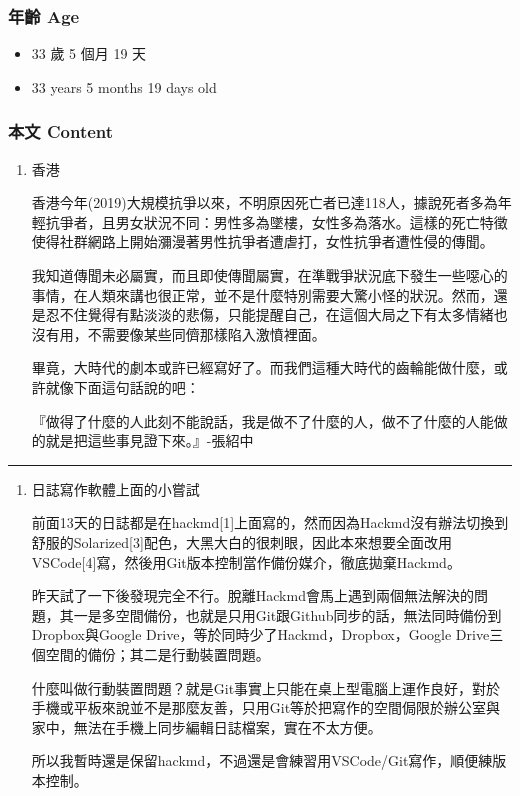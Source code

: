 \documentclass[
]{article}
\providecommand{\tightlist}{%
  \setlength{\itemsep}{0pt}\setlength{\parskip}{0pt}}
\begin{document}
\hypertarget{ux5e74ux9f61-age-11}{%
\subsubsection{年齡 Age}\label{ux5e74ux9f61-age-11}}

\begin{itemize}
\tightlist
\item
  33 歲 5 個月 19 天
\item
  33 years 5 months 19 days old
\end{itemize}

\hypertarget{ux672cux6587-content-11}{%
\subsubsection{本文 Content}\label{ux672cux6587-content-11}}

\begin{enumerate}
\def\labelenumi{\arabic{enumi}.}
\item
  香港

  香港今年(2019)大規模抗爭以來，不明原因死亡者已達118人，據說死者多為年輕抗爭者，且男女狀況不同：男性多為墜樓，女性多為落水。這樣的死亡特徵使得社群網路上開始瀰漫著男性抗爭者遭虐打，女性抗爭者遭性侵的傳聞。

  我知道傳聞未必屬實，而且即使傳聞屬實，在準戰爭狀況底下發生一些噁心的事情，在人類來講也很正常，並不是什麼特別需要大驚小怪的狀況。然而，還是忍不住覺得有點淡淡的悲傷，只能提醒自己，在這個大局之下有太多情緒也沒有用，不需要像某些同儕那樣陷入激憤裡面。

  畢竟，大時代的劇本或許已經寫好了。而我們這種大時代的齒輪能做什麼，或許就像下面這句話說的吧：

  『做得了什麼的人此刻不能說話，我是做不了什麼的人，做不了什麼的人能做的就是把這些事見證下來。』-張紹中
\end{enumerate}

\begin{center}\rule{0.5\linewidth}{\linethickness}\end{center}

\begin{enumerate}
\def\labelenumi{\arabic{enumi}.}
\setcounter{enumi}{1}
\item
  日誌寫作軟體上面的小嘗試

  前面13天的日誌都是在hackmd{[}1{]}上面寫的，然而因為Hackmd沒有辦法切換到舒服的Solarized{[}3{]}配色，大黑大白的很刺眼，因此本來想要全面改用VSCode{[}4{]}寫，然後用Git版本控制當作備份媒介，徹底拋棄Hackmd。

  昨天試了一下後發現完全不行。脫離Hackmd會馬上遇到兩個無法解決的問題，其一是多空間備份，也就是只用Git跟Github同步的話，無法同時備份到Dropbox與Google
  Drive，等於同時少了Hackmd，Dropbox，Google
  Drive三個空間的備份；其二是行動裝置問題。

  什麼叫做行動裝置問題？就是Git事實上只能在桌上型電腦上運作良好，對於手機或平板來說並不是那麼友善，只用Git等於把寫作的空間侷限於辦公室與家中，無法在手機上同步編輯日誌檔案，實在不太方便。

  所以我暫時還是保留hackmd，不過還是會練習用VSCode/Git寫作，順便練版本控制。
\end{enumerate}
\end{document}
